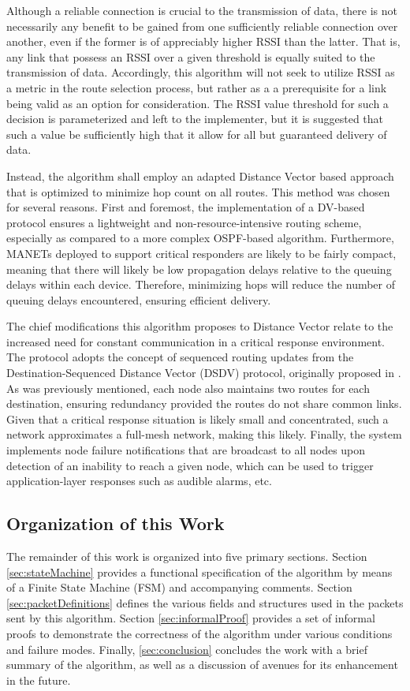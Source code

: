 Although a reliable connection is crucial to the transmission of data, there is not necessarily any benefit to be gained from one sufficiently reliable connection over another, even if the former is of appreciably higher RSSI than the latter. That is, any link that possess an RSSI over a given threshold is equally suited to the transmission of data. Accordingly, this algorithm will not seek to utilize RSSI as a metric in the route selection process, but rather as a a prerequisite for a link being valid as an option for consideration. The RSSI value threshold for such a decision is parameterized and left to the implementer, but it is suggested that such a value be sufficiently high that it allow for all but guaranteed delivery of data.

Instead, the algorithm shall employ an adapted Distance Vector based approach that is optimized to minimize hop count on all routes. This method was chosen for several reasons. First and foremost, the implementation of a DV-based protocol ensures a lightweight and non-resource-intensive routing scheme, especially as compared to a more complex OSPF-based algorithm. Furthermore, MANETs deployed to support critical responders are likely to be fairly compact, meaning that there will likely be low propagation delays relative to the queuing delays within each device. Therefore, minimizing hops will reduce the number of queuing delays encountered, ensuring efficient delivery.

The chief modifications this algorithm proposes to Distance Vector relate to the increased need for constant communication in a critical response environment. The protocol adopts the concept of sequenced routing updates from the Destination-Sequenced Distance Vector (DSDV) protocol, originally proposed in \cite{perkins_highly_1994}. As was previously mentioned, each node also maintains two routes for each destination, ensuring redundancy provided the routes do not share common links. Given that a critical response situation is likely small and concentrated, such a network approximates a full-mesh network, making this likely. Finally, the system implements node failure notifications that are broadcast to all nodes upon detection of an inability to reach a given node, which can be used to trigger application-layer responses such as audible alarms, etc.

\subsection{Organization of this Work}\label{subsec:IntroOrganization}
The remainder of this work is organized into five primary sections. Section \ref{sec:stateMachine} provides a functional specification of the algorithm by means of a Finite State Machine (FSM) and accompanying comments. Section \ref{sec:packetDefinitions} defines the various fields and structures used in the packets sent by this algorithm. Section \ref{sec:informalProof} provides a set of informal proofs to demonstrate the correctness of the algorithm under various conditions and failure modes. Finally, \ref{sec:conclusion} concludes the work with a brief summary of the algorithm, as well as a discussion of avenues for its enhancement in the future.